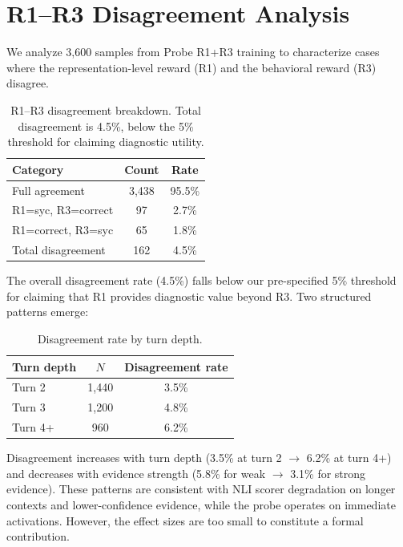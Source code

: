 \documentclass[11pt,a4paper]{article}
\begin{document}


\appendix

\section{R1--R3 Disagreement Analysis}
\label{app:disagreement}

We analyze 3{,}600 samples from Probe R1+R3 training to characterize cases where the representation-level reward (R1) and the behavioral reward (R3) disagree.

\begin{table}[h]
\centering
\small
\begin{tabular}{@{}lcc@{}}
\toprule
Category & Count & Rate \\
\midrule
Full agreement & 3{,}438 & 95.5\% \\
R1=syc, R3=correct & 97 & 2.7\% \\
R1=correct, R3=syc & 65 & 1.8\% \\
Total disagreement & 162 & 4.5\% \\
\bottomrule
\end{tabular}
\caption{R1--R3 disagreement breakdown. Total disagreement is 4.5\%, below the 5\% threshold for claiming diagnostic utility.}
\label{tab:disagree}
\end{table}

The overall disagreement rate (4.5\%) falls below our pre-specified 5\% threshold for claiming that R1 provides diagnostic value beyond R3. Two structured patterns emerge:

\begin{table}[h]
\centering
\small
\begin{tabular}{@{}lcc@{}}
\toprule
Turn depth & $N$ & Disagreement rate \\
\midrule
Turn 2 & 1{,}440 & 3.5\% \\
Turn 3 & 1{,}200 & 4.8\% \\
Turn 4+ & 960 & 6.2\% \\
\bottomrule
\end{tabular}
\caption{Disagreement rate by turn depth.}
\label{tab:disagree_depth}
\end{table}

Disagreement increases with turn depth (3.5\% at turn 2 $\to$ 6.2\% at turn 4+) and decreases with evidence strength (5.8\% for weak $\to$ 3.1\% for strong evidence). These patterns are consistent with NLI scorer degradation on longer contexts and lower-confidence evidence, while the probe operates on immediate activations. However, the effect sizes are too small to constitute a formal contribution.
\end{document}
